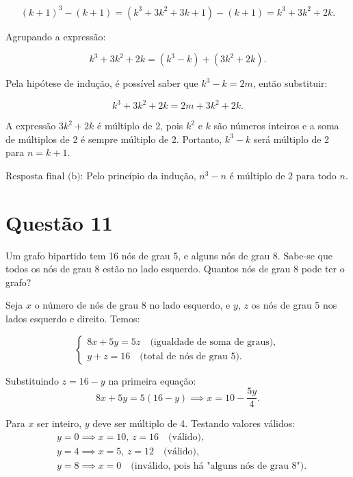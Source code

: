 \[
(k+1)^3 - (k+1) = (k^3 + 3k^2 + 3k + 1) - (k + 1) = k^3 + 3k^2 + 2k.
\]

Agrupando a expressão:

\[
k^3 + 3k^2 + 2k = (k^3 - k) + (3k^2 + 2k).
\]

Pela hipótese de indução, é possível saber que \(k^3 - k = 2m\), então substituir:

\[
k^3 + 3k^2 + 2k = 2m + 3k^2 + 2k.
\]

A expressão \(3k^2 + 2k\) é múltiplo de 2, pois \(k^2\) e \(k\) são números inteiros e a soma de múltiplos de 2 é sempre múltiplo de 2. Portanto, \(k^3 - k\) será múltiplo de 2 para \(n = k + 1\).

\vspace{10pt}

\(\boxed{\text{Resposta final (b): Pelo princípio da indução, } n^3 - n \text{ é múltiplo de 2 para todo } n.}\)


\section*{Questão 11}

Um grafo bipartido tem 16 nós de grau 5, e alguns nós de grau 8. Sabe-se que todos os nós de grau 8 estão no lado esquerdo. Quantos nós de grau 8 pode ter o grafo?

\vspace{10pt}

Seja \( x \) o número de nós de grau 8 no lado esquerdo, e \( y \), \( z \) os nós de grau 5 nos lados esquerdo e direito. Temos:

\[
\begin{cases}
8x + 5y = 5z \quad \text{(igualdade de soma de graus)}, \\
y + z = 16 \quad \text{(total de nós de grau 5)}.
\end{cases}
\]

Substituindo \( z = 16 - y \) na primeira equação:
\[
8x + 5y = 5(16 - y) \implies x = 10 - \frac{5y}{4}.
\]

Para \( x \) ser inteiro, \( y \) deve ser múltiplo de 4. Testando valores válidos:
\[
\begin{aligned}
& y = 0 \implies x = 10, \, z = 16 \quad \text{(válido)}, \\
& y = 4 \implies x = 5, \, z = 12 \quad \text{(válido)}, \\
& y = 8 \implies x = 0 \quad \text{(inválido, pois há "alguns nós de grau 8")}.
\end{aligned}
\]

